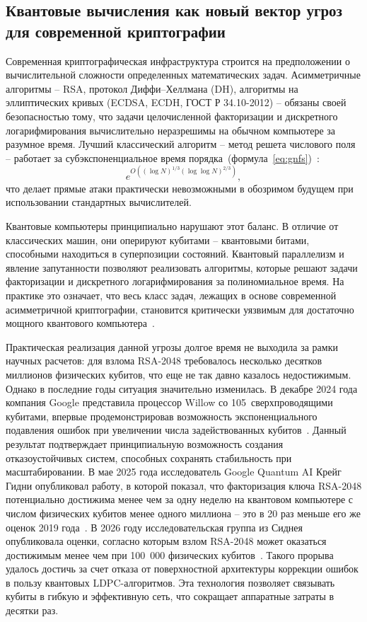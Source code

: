 \documentclass{itmo-vkr}
\begin{document}
	
	\subsection{Квантовые вычисления как новый вектор угроз для современной криптографии}
	
	Современная криптографическая инфраструктура строится на предположении о вычислительной сложности определенных математических задач. 
	Асимметричные алгоритмы  --  RSA, протокол Диффи–Хеллмана (DH), алгоритмы на эллиптических кривых (ECDSA, ECDH, ГОСТ Р 34.10-2012)  --  обязаны своей безопасностью тому, что задачи целочисленной факторизации и дискретного логарифмирования вычислительно неразрешимы на обычном компьютере за разумное время. Лучший классический алгоритм -- метод решета числового поля -- работает за субэкспоненциальное время порядка~(формула~\ref{eq:gnfs})~\cite{menezes1996handbook}:
\begin{equation}
	e^{O\left((\log N)^{1/3} (\log \log N)^{2/3}\right)},
	\label{eq:gnfs}
\end{equation}
что делает прямые атаки практически невозможными в обозримом будущем при использовании стандартных вычислителей.
	
	Квантовые компьютеры принципиально нарушают этот баланс. В отличие от классических машин, они оперируют кубитами -- квантовыми битами, способными находиться в суперпозиции состояний. Квантовый параллелизм и явление запутанности позволяют реализовать алгоритмы, которые решают задачи факторизации и дискретного логарифмирования за полиномиальное время. На практике это означает, что весь класс задач, лежащих в основе современной асимметричной криптографии, становится критически уязвимым для достаточно мощного квантового компьютера~\cite{krivtsun2023kvantovye}.
	
	
	
	Практическая реализация данной угрозы долгое время не выходила за рамки научных расчетов: для взлома RSA-2048 требовалось несколько десятков миллионов физических кубитов, что еще не так давно казалось недостижимым. Однако в последние годы ситуация значительно изменилась. В декабре 2024 года компания Google представила процессор Willow со 105~сверхпроводящими кубитами, впервые продемонстрировав возможность экспоненциального подавления ошибок при увеличении числа задействованных кубитов~\cite{google-willow-2024}. Данный результат подтверждает принципиальную возможность создания отказоустойчивых систем, способных сохранять стабильность при масштабировании. В мае 2025 года исследователь Google Quantum AI Крейг Гидни опубликовал работу, в которой показал, что факторизация ключа RSA-2048 потенциально достижима менее чем за одну неделю на квантовом компьютере с числом физических кубитов менее одного миллиона -- это в 20 раз меньше его же оценок 2019 года~\cite{gidney2025million}. В 2026 году исследовательская группа из Сиднея опубликовала оценки, согласно которым взлом RSA-2048 может оказаться достижимым менее чем при 100~000 физических кубитов~\cite{iceberg2026pinnacle}. Такого прорыва удалось достичь за счет отказа от поверхностной архитектуры коррекции ошибок в пользу квантовых LDPC-алгоритмов. Эта технология позволяет связывать кубиты в гибкую и эффективную сеть, что сокращает аппаратные затраты в десятки раз. 
	
\end{document}
